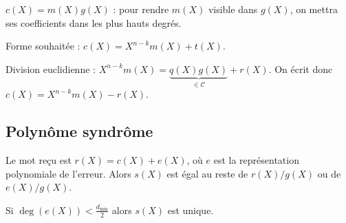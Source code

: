 	$c(X) = m(X)g(X)$ : pour rendre $m(X)$ visible dans $g(X)$, on mettra ses coefficients dans les plus hauts degrés.
	
	Forme souhaitée : $c(X) = X^{n - k} m(X) + t(X)$.
	
	Division euclidienne : $X^{n - k} m(X) = \underset{\in \mathcal{C}}{\underbrace{q(X)g(X)}} + r(X)$.
	On écrit donc $c(X) = X^{n - k} m(X) - r(X)$.


\subsection{Polynôme syndrôme}

	Le mot reçu est $r(X) = c(X) + e(X)$, où $e$ est la représentation polynomiale de l'erreur.
	Alors $s(X)$ est égal au reste de $r(X)/g(X)$ ou de $e(X)/g(X)$.

	Si $\deg(e(X)) < \frac{d_{\min}}{2}$ alors $s(X)$ est unique.
